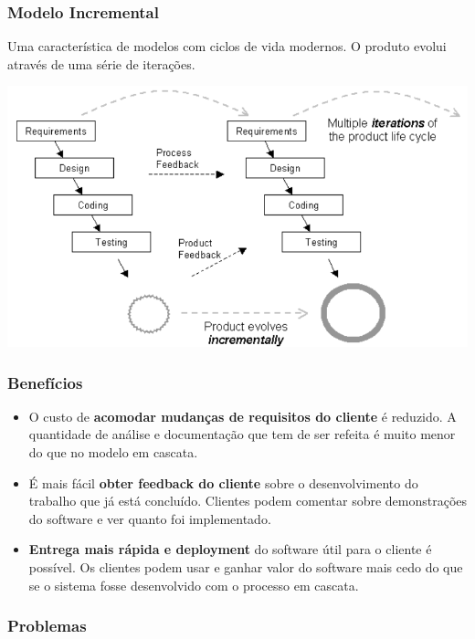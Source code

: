 \documentclass{article}
\begin{document}
\pagebreak

\subsubsection{Modelo Incremental}

Uma característica de modelos com ciclos de vida modernos.
O produto evolui através de uma série de iterações.

\begin{center}
  \includegraphics[scale=0.5]{12}
\end{center}

\subsubsection*{Benefícios}

\begin{itemize}
  \item O custo de \textbf{acomodar mudanças de requisitos do cliente} é reduzido.
  A quantidade de análise e documentação que tem de ser refeita é muito menor
  do que no modelo em cascata.

  \item É mais fácil \textbf{obter feedback do cliente} sobre o desenvolvimento
  do trabalho que já está concluído.
  Clientes podem comentar sobre demonstrações do software e ver
  quanto foi implementado.

  \item \textbf{Entrega mais rápida e deployment} do software útil
  para o cliente é possível. Os clientes podem usar e ganhar valor
  do software mais cedo do que se o sistema fosse desenvolvido
  com o processo em cascata.
\end{itemize}

\subsubsection*{Problemas}
\end{document}
